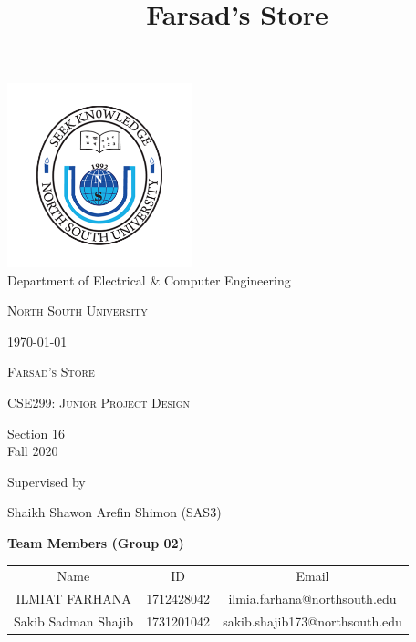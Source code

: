 \documentclass[12pt]{article}
\title{Farsad's Store}
\begin{document}
\begin{titlepage}
    \begin{center}
        \includegraphics[width=0.4\textwidth]{NSU.png} \\
        Department of Electrical \& Computer Engineering\\
        {\scshape\LARGE North South University \par}
        \today
        \vspace{1cm}
        
        {\scshape\Large Farsad's Store\par}
 
        \vspace{0.5cm}
        {\scshape\Large CSE299: Junior Project Design\par}
        Section 16 \\ Fall 2020
             
        \vspace{0.5cm}
        Supervised by\par
	    Shaikh Shawon Arefin Shimon (SAS3) \par
        \vspace{0.5cm}
        \textbf{Team Members (Group 02)} \par
        \begin{tabular}{c c c}
            Name & ID & Email \\
            ILMIAT FARHANA & 1712428042 & ilmia.farhana@northsouth.edu \\
            Sakib Sadman Shajib & 1731201042 & sakib.shajib173@northsouth.edu \\
        \end{tabular}

        \vfill
             
    \end{center}
\end{titlepage}
\end{document}
